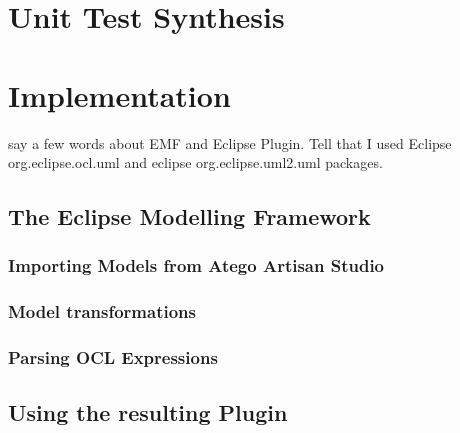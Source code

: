 \section{Unit Test Synthesis}
\label{sec:testgenerationUnitTestSynthesis}

\section{Implementation}
\label{sec:testgenerationImplementation}
say a few words about EMF and Eclipse Plugin. Tell that I used Eclipse org.eclipse.ocl.uml and eclipse org.eclipse.uml2.uml packages. 
\subsection{The Eclipse Modelling Framework}
\cite{EMF}
\subsubsection{Importing Models from Atego Artisan Studio}
\subsubsection{Model transformations}
\subsubsection{Parsing OCL Expressions}
\subsection{Using the resulting Plugin}
